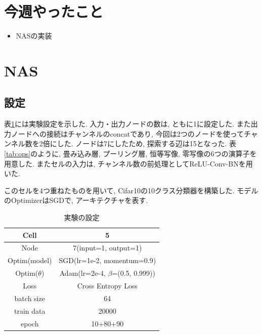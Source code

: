 \documentclass[twocolumn]{jarticle}     %
\begin{document}


\section{今週やったこと}
\begin{itemize}
	\item {NASの実装}
\end{itemize}

\section{NAS}
\subsection{設定}
表\ref{tab:setting}には実験設定を示した.
入力・出力ノードの数は, ともに1に設定した.
また出力ノードへの接続はチャンネルのconcatであり, 今回は2つのノードを使ってチャンネル数を2倍にした.
ノードは7にしたため, 探索する辺は15となった.
表\ref{tab:ops}のように, 畳み込み層, プーリング層, 恒等写像, 零写像の6つの演算子を用意した.
またセルの入力は, チャンネル数の前処理としてReLU-Conv-BNを用いた.

このセルを4つ重ねたものを用いて, Cifar10の10クラス分類器を構築した.
モデルのOptimizerはSGDで, アーキテクチャを表す.

\begin{table}[tb]
  \begin{center}
    \caption{実験の設定}
    \begin{tabular}{|c|c|} \hline
      Cell & 5 \\ \hline
      Node & 7(input=1, output=1) \\ \hline
      Optim(model) & SGD(lr=1e-2, momentum=0.9) \\ \hline
      Optim($\theta$) & Adam(lr=2e-4, $\beta$=(0.5, 0.999)) \\ \hline
      Loss & Cross Entropy Loss \\ \hline
      batch size & 64 \\ \hline
      train data & 20000 \\ \hline
      epoch & 10+80+90 \\ \hline
    \end{tabular}
    \label{tab:setting}
  \end{center}
\end{table}
\end{document}
